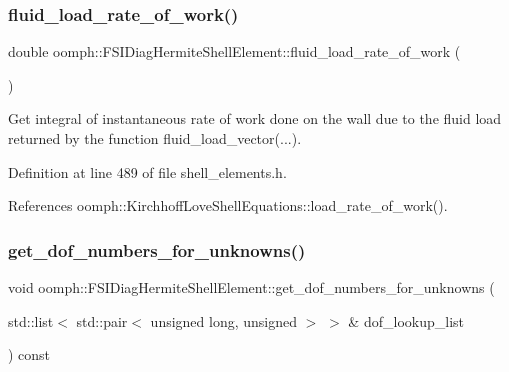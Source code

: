\subsubsection{\texorpdfstring{fluid\+\_\+load\+\_\+rate\+\_\+of\+\_\+work()}{fluid\_load\_rate\_of\_work()}}
{\footnotesize\ttfamily double oomph\+::\+F\+S\+I\+Diag\+Hermite\+Shell\+Element\+::fluid\+\_\+load\+\_\+rate\+\_\+of\+\_\+work (\begin{DoxyParamCaption}{ }\end{DoxyParamCaption})\hspace{0.3cm}{\ttfamily [inline]}}



Get integral of instantaneous rate of work done on the wall due to the fluid load returned by the function fluid\+\_\+load\+\_\+vector(...). 



Definition at line 489 of file shell\+\_\+elements.\+h.



References oomph\+::\+Kirchhoff\+Love\+Shell\+Equations\+::load\+\_\+rate\+\_\+of\+\_\+work().

\mbox{\label{classoomph_1_1FSIDiagHermiteShellElement_a41c37ca0ac22147cc0b16dea14b70418}} 
\subsubsection{\texorpdfstring{get\+\_\+dof\+\_\+numbers\+\_\+for\+\_\+unknowns()}{get\_dof\_numbers\_for\_unknowns()}}
{\footnotesize\ttfamily void oomph\+::\+F\+S\+I\+Diag\+Hermite\+Shell\+Element\+::get\+\_\+dof\+\_\+numbers\+\_\+for\+\_\+unknowns (\begin{DoxyParamCaption}\item[{std\+::list$<$ std\+::pair$<$ unsigned long, unsigned $>$ $>$ \&}]{dof\+\_\+lookup\+\_\+list }\end{DoxyParamCaption}) const\hspace{0.3cm}{\ttfamily [virtual]}}




